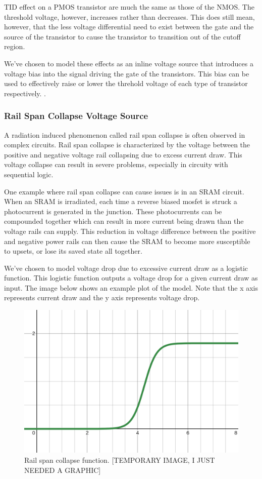 \documentclass[conference]{IEEEtran}
\begin{document}
TID effect on a PMOS transistor are much the same as those of the NMOS. The threshold voltage, however, increases rather than decreases. This does still mean, however, that the less voltage differential need to exist between the gate and the source of the transistor to cause the transistor to transition out of the cutoff region.

We've chosen to model these effects as an inline voltage source that introduces a voltage bias into the signal driving the gate of the transistors. This bias can be used to effectively raise or lower the threhold voltage of each type of transistor respectively.
\cite{Pepper1990}.

\vspace{1em}
\subsubsection{Rail Span Collapse Voltage Source}
A radiation induced phenomenon called rail span collapse is often observed in complex circuits. Rail span collapse is characterized by the voltage between the positive and negative voltage rail collapsing due to excess current draw. This voltage collapse can result in severe problems, especially in circuity with sequential logic.

One example where rail span collapse can cause issues is in an SRAM circuit. When an SRAM is irradiated, each time a reverse biased mosfet is struck a photocurrent is generated in the junction. These photocurrents can be compounded together which can result in more current being drawn than the voltage rails can supply. This reduction in voltage difference between the positive and negative power rails can then cause the SRAM to become more susceptible to upsets, or lose its saved state all together. 

We've chosen to model voltage drop due to excessive current draw as a logistic function. This logistic function outputs a voltage drop for a given current draw as input. The image below shows an example plot of the model. Note that the x axis represents current draw and the y axis represents voltage drop.

\begin{figure}[htbp]
\centering
\includegraphics[width=0.95\linewidth]{rail_collapse_function.png}
\caption{Rail span collapse function. [TEMPORARY IMAGE, I JUST NEEDED A GRAPHIC]}
\label{fig:rail_collapse_function}
\end{figure}
\end{document}
